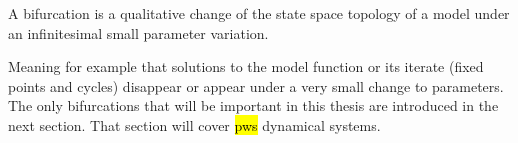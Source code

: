 \begin{definition}[Bifurcation]
	A bifurcation is a qualitative change of the state space topology of a model under an infinitesimal small parameter variation.
\end{definition}
Meaning for example that solutions to the model function or its iterate (fixed points and cycles) disappear or appear under a very small change to parameters.
The only bifurcations that will be important in this thesis are introduced in the next section.
That section will cover \hl{\gls{pws}} dynamical systems.
